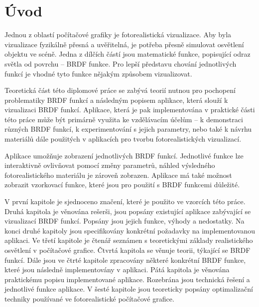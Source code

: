 \documentclass[czech,master]{diploma}
\begin{document}
\MakeTitlePages

\listoffigures
\clearpage

\listoftables
\clearpage

\chapter*{Úvod}
\setcounter{page}{1} %
Jednou z oblastí počítačové grafiky je fotorealistická vizualizace. Aby byla vizualizace fyzikálně přesná a uvěřitelná, je potřeba přesně simulovat osvětlení objektu ve scéně. Jedna z dílčích částí jsou matematické funkce, popisující odraz světla od povrchu -- BRDF funkce. Pro lepší představu chování jednotlivých funkcí je vhodné tyto funkce nějakým způsobem vizualizovat. \par
Teoretická část této diplomové práce se zabývá teorií nutnou pro pochopení problematiky BRDF funkcí a následným popisem aplikace, která slouží k vizualizaci BRDF funkcí. Aplikace, která je pak implementována v praktické části této práce může být primárně využita ke vzdělávacím účelům -- k demonstraci různých BRDF funkcí, k experimentování s jejich parametry, nebo také k návrhu materiálů dále použitých v aplikacích pro tvorbu fotorealistických vizualizací. \par
Aplikace umožňuje zobrazení jednotlivých BRDF funkcí. Jednotlivé funkce lze interaktivně ovlivňovat pomocí změny parametrů, náhled výsledného fotorealistického materiálu je zároveň zobrazen. Aplikace má také možnost zobrazit vzorkovací funkce, které jsou pro použití s BRDF funkcemi důležité. \par
V první kapitole je sjednoceno značení, které je použito ve vzorcích této práce. Druhá kapitola je věnována rešerši, jsou popsány existující aplikace zabývající se vizualizací BRDF funkcí. Popsány jsou jejich funkce, výhody a nedostatky. Na konci druhé kapitoly jsou specifikovány konkrétní požadavky na implementovanou aplikaci. Ve třetí kapitole je čtenář seznámen s teoretickými základy realistického osvětlení v počítačové grafice. Čtvrtá kapitola se věnuje teorii, týkající se BRDF funkcí. Dále jsou ve čtrté kapitole zpracovány některé konkrétní BRDF funkce, které jsou následně implementovány v aplikaci. Pátá kapitola je věnována praktickému popisu implementované aplikace. Rozebrána jsou technická řešení a jednotlivé funkce aplikace. V šesté kapitole jsou teoreticky popsány optimalizační techniky používané ve fotorealistické počítačové grafice.
\end{document}
